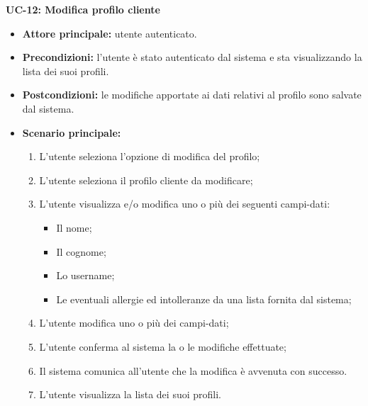 \textbf{UC-12: Modifica profilo cliente}
\begin{itemize}
\item \textbf{Attore principale:} utente autenticato.
\item \textbf{Precondizioni:} l'utente è stato autenticato dal sistema e sta visualizzando la lista dei suoi profili.
\item \textbf{Postcondizioni:} le modifiche apportate ai dati relativi al profilo sono salvate dal sistema.
\item \textbf{Scenario principale:}
\begin{enumerate}
    \item L'utente seleziona l'opzione di modifica del profilo;
    \item L'utente seleziona il profilo cliente da modificare;
    \item L'utente visualizza e/o modifica uno o più dei seguenti campi-dati:
        \begin{itemize}
            \item Il nome;
            \item Il cognome;
            \item Lo username;
            \item Le eventuali allergie ed intolleranze da una lista fornita dal sistema;
        \end{itemize}
    \item L'utente modifica uno o più dei campi-dati;
    \item L'utente conferma al sistema la o le modifiche effettuate;
    \item Il sistema comunica all'utente che la modifica è avvenuta con successo.
    \item L'utente visualizza la lista dei suoi profili.
\end{enumerate}
\end{itemize}

